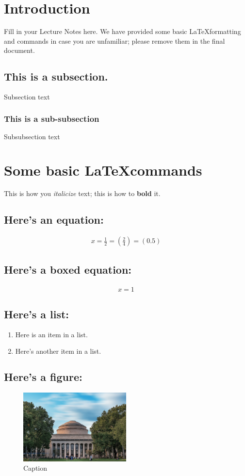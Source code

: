 \documentclass[12pt]{report}
\begin{document}
\maketitle
\tableofcontents


\section{Introduction}
Fill in your Lecture Notes here. We have provided some basic \LaTeX formatting and commands in case you are unfamiliar; please remove them in the final document. 

\subsection{This is a subsection.}
Subsection text

\subsubsection{This is a sub-subsection}
Subsubsection text


\section{Some basic \LaTeX commands}

This is how you \emph{italicize} text; this is how to \textbf{bold} it. 

\subsection{Here's an equation:}
\begin{align}
    x = \frac{1}{2} = \left( \frac{2}{4} \right) = (0.5)
\end{align}

\subsection{Here's a boxed equation: }
\begin{align}
    \boxed{x = 1}
\end{align}

\subsection{Here's a list: }
\begin{enumerate}
    \item Here is an item in a list.
    \item Here's another item in a list.
\end{enumerate}

\subsection{Here's a figure:}

\begin{figure}[h]
    \centering
    \includegraphics[width=0.5\textwidth]{topper_8-8.jpg}
    \caption{Caption}
    \label{fig:my_label}
\end{figure}
\end{document}
